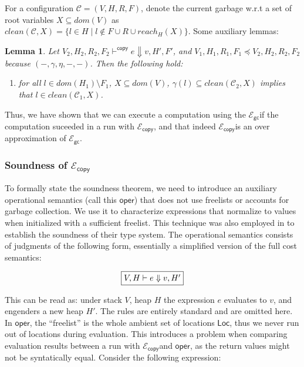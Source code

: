 \documentclass{easychair}
\newcommand{\ms}[1]{\ensuremath{\mathsf{#1}}}
\newcounter{rule}
\newcommand{\gcSem}{\ensuremath{\mathcal{E}_{\ms{gc}}}}
\newcommand{\copySem}{\ensuremath{\mathcal{E}_{\ms{copy}}}}
\newtheorem{lemma}[theorem]{Lemma}
\theoremstyle{definition}
\begin{document}
For a configuration $\mathcal{C} = (V,H,R,F)$, denote the current garbage w.r.t a set of root variables 
$X \subseteq dom(V)$ 
as $clean(\mathcal{C},X) = \{l \in H \mid l \notin F \cup R \cup reach_H(X)\}$. Some auxiliary lemmas: 

\begin{lemma}\label{itm:aux}
Let $V_2,H_2,R_2,F_2 \vdash^{\mathsf{copy}} e \Downarrow v,H',F'$, and 
$V_1,H_1,R_1,F_1 \preceq V_2,H_2,R_2,F_2$ because $(-,\gamma,\eta,-,-)$. Then the following hold:
\begin{enumerate}
\item for all $l \in dom(H_1) \setminus F_1$, 
$X \subseteq dom(V)$, $\gamma(l) \subseteq clean(\mathcal{C}_2,X)$ implies that 
$l \in clean(\mathcal{C}_1,X)$.
\end{enumerate}
\end{lemma}

Thus, we have shown that we can execute a computation using the 
\gcSem if the computation suceeded in a run with \copySem, and that indeed 
\copySem is an over approximation of \gcSem.

\subsubsection{Soundness of \copySem}
\label{sect:soundcopy}

To formally state the soundness theorem,
we need to introduce an auxiliary operational semantics (call this \ms{oper}) 
that does not use freelists or accounts for garbage collection. We use
it to characterize expressions that normalize to values when initialized with a sufficient 
freelist.  This technique was also employed in \cite{Hofmann:2003:SPH:604131.604148} 
to establish the soundness of their type system. The operational semantics consists of 
judgments of the following form, essentially a simplified version of the full cost semantics:

\[
\fbox{$V,H \vdash e \Downarrow v, H'$}
\]

This can be read as: under stack $V$, heap $H$ the expression $e$ evaluates to $v$, 
and engenders a new heap $H'$. The rules are entirely standard and are omitted here.
In $\ms{oper}$, the ``freelist'' is the whole ambient set of locations $\ms{Loc}$, 
thus we never run out of locations during evaluation. This introduces a problem when comparing 
evaluation results between a run with \copySem and $\ms{oper}$, as the return values 
might not be syntatically equal. Consider the following expression:
\end{document}
